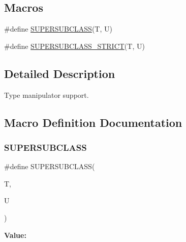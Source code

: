 \subsection*{Macros}
\begin{DoxyCompactItemize}
\item 
\#define \mbox{\hyperlink{adat-devel_2lib_2adat_2typemanip_8h_a2820bb39352560126da663542139bd9b}{S\+U\+P\+E\+R\+S\+U\+B\+C\+L\+A\+SS}}(T,  U)
\item 
\#define \mbox{\hyperlink{adat-devel_2lib_2adat_2typemanip_8h_a1fc3ad32150bb48c1b2053d488b5f46f}{S\+U\+P\+E\+R\+S\+U\+B\+C\+L\+A\+S\+S\+\_\+\+S\+T\+R\+I\+CT}}(T,  U)
\end{DoxyCompactItemize}


\subsection{Detailed Description}
Type manipulator support. 



\subsection{Macro Definition Documentation}
\mbox{\label{adat-devel_2lib_2adat_2typemanip_8h_a2820bb39352560126da663542139bd9b}} 
\subsubsection{\texorpdfstring{SUPERSUBCLASS}{SUPERSUBCLASS}}
{\footnotesize\ttfamily \#define S\+U\+P\+E\+R\+S\+U\+B\+C\+L\+A\+SS(\begin{DoxyParamCaption}\item[{}]{T,  }\item[{}]{U }\end{DoxyParamCaption})}

{\bfseries Value\+:}
\begin{DoxyCode}{0}

\end{DoxyCode}
\mbox{\label{adat-devel_2lib_2adat_2typemanip_8h_a1fc3ad32150bb48c1b2053d488b5f46f}} 
